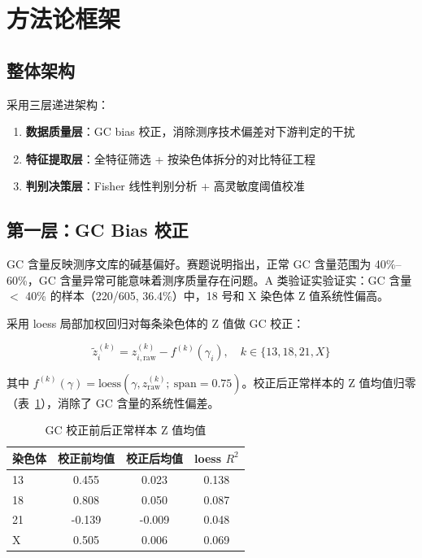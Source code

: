\documentclass{internal-report}
\begin{document}
\section{方法论框架}

\subsection{整体架构}

采用三层递进架构：

\begin{enumerate}
    \item \textbf{数据质量层}：GC bias 校正，消除测序技术偏差对下游判定的干扰
    \item \textbf{特征提取层}：全特征筛选 + 按染色体拆分的对比特征工程
    \item \textbf{判别决策层}：Fisher 线性判别分析 + 高灵敏度阈值校准
\end{enumerate}

\subsection{第一层：GC Bias 校正}

GC 含量反映测序文库的碱基偏好。赛题说明指出，正常 GC 含量范围为 40\%--60\%，GC 含量异常可能意味着测序质量存在问题。A 类验证实验证实：GC 含量 $<$ 40\% 的样本（220/605, 36.4\%）中，18 号和 X 染色体 Z 值系统性偏高。

采用 loess 局部加权回归对每条染色体的 Z 值做 GC 校正：

\begin{equation}
\tilde{z}_i^{(k)} = z_{i,\text{raw}}^{(k)} - f^{(k)}(\gamma_i), \quad k \in \{13,18,21,X\}
\end{equation}

其中 $f^{(k)}(\gamma) = \text{loess}(\gamma, z^{(k)}_{\text{raw}}; \ \text{span}=0.75)$。校正后正常样本的 Z 值均值归零（表~\ref{tab:gc}），消除了 GC 含量的系统性偏差。

\begin{table}[H]
\centering
\caption{GC 校正前后正常样本 Z 值均值}
\label{tab:gc}
\begin{tabular}{lccc}
\toprule
染色体 & 校正前均值 & 校正后均值 & loess $R^2$ \\
\midrule
13 & 0.455 & 0.023 & 0.138 \\
18 & 0.808 & 0.050 & 0.087 \\
21 & -0.139 & -0.009 & 0.048 \\
X  & 0.505 & 0.006 & 0.069 \\
\bottomrule
\end{tabular}
\end{table}
\end{document}

